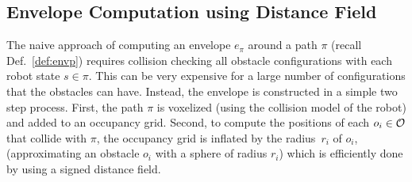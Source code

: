 \documentclass[a4paper]{report}
\begin{document}
\subsection{Envelope Computation using Distance Field}
\label{sec:impl_details}
The naive approach of computing an envelope $e_\pi$ around a path $\pi$ (recall Def.~\ref{def:envp}) requires collision checking all obstacle configurations with each robot state $s \in \pi$. This can be very expensive for a large number of configurations that the obstacles can have.
%
%
%
%
%
%
Instead, the envelope is constructed in a simple two step process.
First, the path $\pi$ is voxelized (using the collision model of the robot) and added to an occupancy grid.
Second, 
to compute the positions of each $o_i \in \mathcal{O}$ that collide with $\pi$, the occupancy grid is inflated by the radius~$r_i$ of $o_i$, (approximating an obstacle $o_i$ with a sphere of radius $r_i$) which is efficiently done by using a signed distance field.
\end{document}
